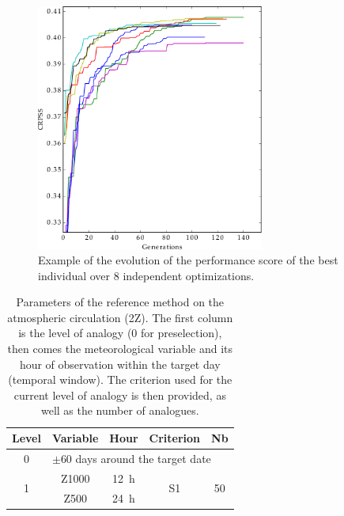 \documentclass[review]{elsarticle}
\begin{document}
\begin{figure}[t]
	\centerline{\includegraphics[width=7.5cm]{figures/fig11.pdf}}
	\caption{Example of the evolution of the performance score of the best individual over 8 independent optimizations.}
	\label{fig:evolution}
\end{figure}

\clearpage


\begin{table}[t]
	\caption{Parameters of the reference method on the atmospheric circulation (2Z). The first column is the level of analogy (0 for preselection), then comes the meteorological variable and its hour of observation within the target day (temporal window). The criterion used for the current level of analogy is then provided, as well as the number of analogues.}
	\footnotesize
	\begin{center}
		\begin{tabular}{ccccc}
			\hline
			Level & Variable & Hour & Criterion & Nb \\ 
			\hline 
			0 & \multicolumn{4}{l}{$\pm 60$ days around the target date} \\
			\hline 
			\multirow{2}{*}{1} & Z1000 & 12~h & \multirow{2}{*}{S1} & \multirow{2}{*}{50} \\
			& Z500 & 24~h & & \\ 
			\hline 
		\end{tabular} 
	\end{center}
	\label{table:params_R1}
\end{table}
\end{document}
